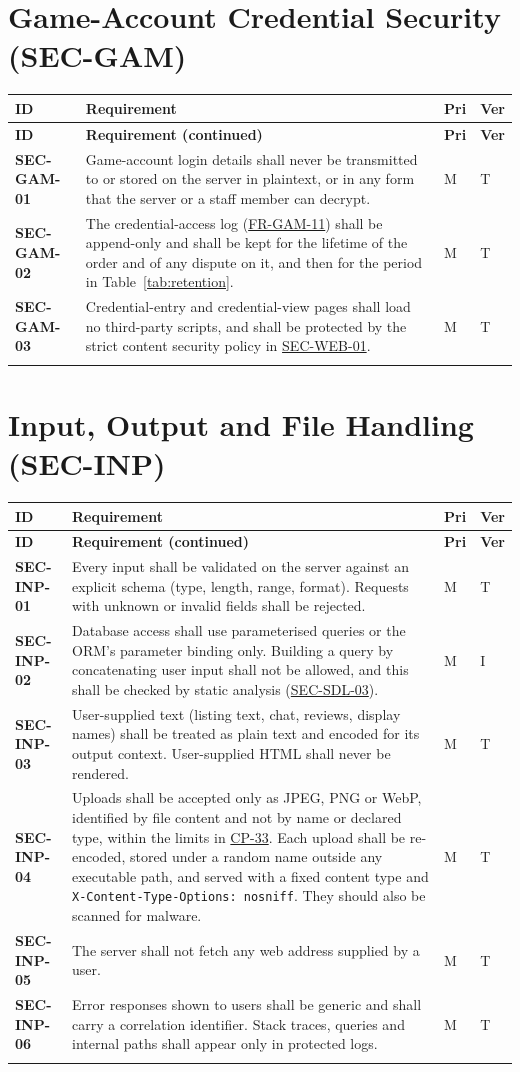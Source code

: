 \documentclass[11pt,a4paper]{report}
\makeatletter
\newenvironment{reqs}{%
  \small
  \begin{longtable}{@{}>{\raggedright\arraybackslash}p{2.35cm}
                       >{\raggedright\arraybackslash}p{10.3cm}
                       >{\centering\arraybackslash}p{0.7cm}
                       >{\centering\arraybackslash}p{0.7cm}@{}}
  \toprule
  \textbf{ID} & \textbf{Requirement} & \textbf{Pri} & \textbf{Ver} \\
  \midrule
  \endfirsthead
  \toprule
  \textbf{ID} & \textbf{Requirement (continued)} & \textbf{Pri} & \textbf{Ver} \\
  \midrule
  \endhead
  \bottomrule
  \endfoot
}{\end{longtable}}
\newcommand{\req}[5]{\leavevmode\textbf{#1}\hypertarget{#1}{} & #5 & #2 & #3 \\ \addlinespace[2pt]}
\newcommand{\rr}[1]{\hyperlink{#1}{#1}}
\newcommand{\cp}[1]{\hyperlink{#1}{#1}}
\makeatother
\begin{document}
\section{Game-Account Credential Security (SEC-GAM)}
\begin{reqs}
\req{SEC-GAM-01}{M}{T}{NFR-21}{Game-account login details shall never be transmitted to or stored on the server in plaintext, or in any form that the server or a staff member can decrypt.}
\req{SEC-GAM-02}{M}{T}{NFR-22}{The credential-access log (\rr{FR-GAM-11}) shall be append-only and shall be kept for the lifetime of the order and of any dispute on it, and then for the period in Table~\ref{tab:retention}.}
\req{SEC-GAM-03}{M}{T}{new}{Credential-entry and credential-view pages shall load no third-party scripts, and shall be protected by the strict content security policy in \rr{SEC-WEB-01}.}
\end{reqs}

\section{Input, Output and File Handling (SEC-INP)}
\begin{reqs}
\req{SEC-INP-01}{M}{T}{new}{Every input shall be validated on the server against an explicit schema (type, length, range, format). Requests with unknown or invalid fields shall be rejected.}
\req{SEC-INP-02}{M}{I}{new}{Database access shall use parameterised queries or the ORM's parameter binding only. Building a query by concatenating user input shall not be allowed, and this shall be checked by static analysis (\rr{SEC-SDL-03}).}
\req{SEC-INP-03}{M}{T}{new}{User-supplied text (listing text, chat, reviews, display names) shall be treated as plain text and encoded for its output context. User-supplied HTML shall never be rendered.}
\req{SEC-INP-04}{M}{T}{new}{Uploads shall be accepted only as JPEG, PNG or WebP, identified by file content and not by name or declared type, within the limits in \cp{CP-33}. Each upload shall be re-encoded, stored under a random name outside any executable path, and served with a fixed content type and \texttt{X-Content-Type-Options: nosniff}. They should also be scanned for malware.}
\req{SEC-INP-05}{M}{T}{new}{The server shall not fetch any web address supplied by a user.}
\req{SEC-INP-06}{M}{T}{new}{Error responses shown to users shall be generic and shall carry a correlation identifier. Stack traces, queries and internal paths shall appear only in protected logs.}
\end{reqs}
\end{document}

